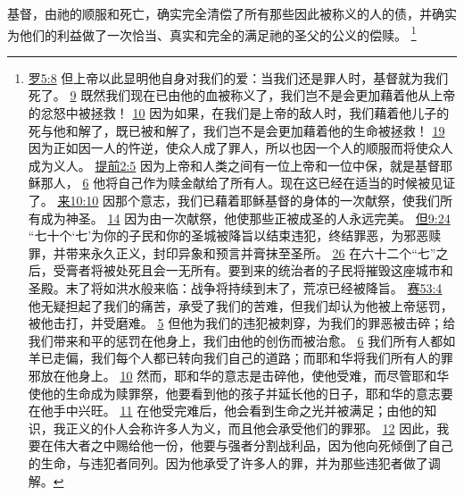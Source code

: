 \documentclass[12pt, a4paper, oneside]{ctexart}
\newcounter{parnum}[section]
\newcommand{\N}{%
   \noindent\refstepcounter{parnum}%
    \makebox[\parindent][l]{\textbf{\arabic{parnum}.}}}
\begin{document}
\N 基督，由祂的顺服和死亡，确实完全清偿了所有那些因此被称义的人的债，并确实为他们的利益做了一次恰当、真实和完全的满足祂的圣父的公义的偿赎。
	\footnote {
		\href{https://biblehub.com/romans/5-8.htm}{罗5:8} 但上帝以此显明他自身对我们的爱：当我们还是罪人时，基督就为我们死了。
		\href{https://biblehub.com/romans/5-9.htm}{9} 既然我们现在已由他的血被称义了，我们岂不是会更加藉着他从上帝的忿怒中被拯救！
		\href{https://biblehub.com/romans/5-10.htm}{10} 因为如果，在我们是上帝的敌人时，我们藉着他儿子的死与他和解了，既已被和解了，我们岂不是会更加藉着他的生命被拯救！
		\href{https://biblehub.com/romans/5-19.htm}{19} 因为正如因一人的忤逆，使众人成了罪人，所以也因一个人的顺服而将使众人成为义人。
		\href{https://biblehub.com/1_timothy/2-5.htm}{提前2:5} 因为上帝和人类之间有一位上帝和一位中保，就是基督耶稣那人，
		\href{https://biblehub.com/1_timothy/2-6.htm}{6} 他将自己作为赎金献给了所有人。现在这已经在适当的时候被见证了。
		\href{https://biblehub.com/hebrews/10-10.htm}{来10:10} 因那个意志，我们已藉着耶稣基督的身体的一次献祭，使我们所有成为神圣。
		\href{https://biblehub.com/hebrews/10-14.htm}{14} 因为由一次献祭，他使那些正被成圣的人永远完美。
		\href{https://biblehub.com/daniel/9-24.htm}{但9:24} “七十个‘七’为你的子民和你的圣城被降旨以结束违犯，终结罪恶，为邪恶赎罪，并带来永久正义，封印异象和预言并膏抹至圣所。
		\href{https://biblehub.com/daniel/9-26.htm}{26} 在六十二个“七”之后，受膏者将被处死且会一无所有。要到来的统治者的子民将摧毁这座城市和圣殿。末了将如洪水般来临：战争将持续到末了，荒凉已经被降旨。
		\href{https://biblehub.com/isaiah/53-4.htm}{赛53:4} 他无疑担起了我们的痛苦，承受了我们的苦难，但我们却认为他被上帝惩罚，被他击打，并受磨难。
		\href{https://biblehub.com/isaiah/53-5.htm}{5} 但他为我们的违犯被刺穿，为我们的罪恶被击碎；给我们带来和平的惩罚在他身上，我们由他的创伤而被治愈。
		\href{https://biblehub.com/isaiah/53-6.htm}{6} 我们所有人都如羊已走偏，我们每个人都已转向我们自己的道路；而耶和华将我们所有人的罪邪放在他身上。
		\href{https://biblehub.com/isaiah/53-10.htm}{10} 然而，耶和华的意志是击碎他，使他受难，而尽管耶和华使他的生命成为赎罪祭，他要看到他的孩子并延长他的日子，耶和华的意志要在他手中兴旺。
		\href{https://biblehub.com/isaiah/53-11.htm}{11} 在他受完难后，他会看到生命之光并被满足；由他的知识，我正义的仆人会称许多人为义，而且他会承受他们的罪邪。
		\href{https://biblehub.com/isaiah/53-12.htm}{12} 因此，我要在伟大者之中赐给他一份，他要与强者分割战利品，因为他向死倾倒了自己的生命，与违犯者同列。因为他承受了许多人的罪，并为那些违犯者做了调解。
	}
\end{document}
